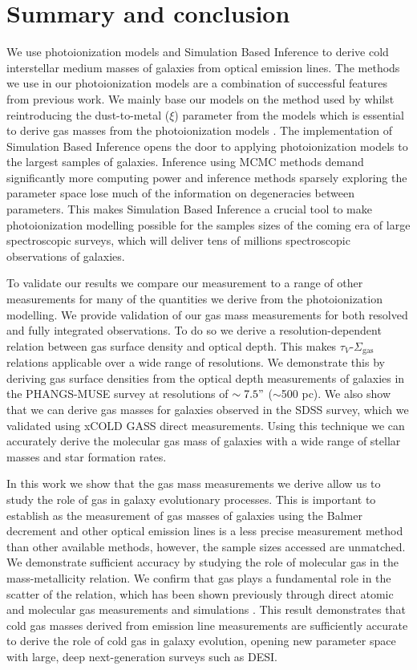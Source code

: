 \documentclass[fleqn,usenatbib]{mnras}
\begin{document}
\section{Summary and conclusion}
\label{sec:conclusion}
We use photoionization models and Simulation Based Inference to derive cold interstellar medium masses of galaxies from optical emission lines. The methods we use in our photoionization models are a combination of successful features from previous work. We mainly base our models on the method used by \cite{byler2017} whilst reintroducing the dust-to-metal ($\xi$) parameter from the \cite{charlot2001} models which is essential to derive gas masses from the photoionization models \citep{brinchmann2013}. The implementation of Simulation Based Inference opens the door to applying photoionization models to the largest samples of galaxies. Inference using MCMC methods demand significantly more computing power and inference methods sparsely exploring the parameter space lose much of the information on degeneracies between parameters. This makes Simulation Based Inference a crucial tool to make photoionization modelling possible for the samples sizes of the coming era of large spectroscopic surveys, which will deliver tens of millions spectroscopic observations of galaxies.

To validate our results we compare our measurement to a range of other measurements for many of the quantities we derive from the photoionization modelling. We provide validation of our gas mass measurements for both resolved and fully integrated observations. To do so we derive a resolution-dependent relation between gas surface density and optical depth. This makes $\tau_{V}$-$\Sigma_{\textrm{gas}}$ relations applicable over a wide range of resolutions. We demonstrate this by deriving gas surface densities from the optical depth measurements of galaxies in the PHANGS-MUSE survey at resolutions of $\sim7.5"$ ($\sim$500 pc). We also show that we can derive gas masses for galaxies observed in the SDSS survey, which we validated using xCOLD GASS direct measurements. Using this technique we can accurately derive the molecular gas mass of galaxies with a wide range of stellar masses and star formation rates. 

In this work we show that the gas mass measurements we derive allow us to study the role of gas in galaxy evolutionary processes. This is important to establish as the measurement of gas masses of galaxies using the Balmer decrement and other optical emission lines is a less precise measurement method than other available methods, however, the sample sizes accessed are unmatched. We demonstrate sufficient accuracy by studying the role of molecular gas in the mass-metallicity relation. We confirm that gas plays a fundamental role in the scatter of the relation, which has been shown previously through direct atomic and molecular gas measurements and simulations \citep[e.g.][]{bothwell2013, bothwell2016, loon2021}. This result demonstrates that cold gas masses derived from emission line measurements are sufficiently accurate to derive the role of cold gas in galaxy evolution, opening new parameter space with large, deep next-generation surveys such as DESI. 
\end{document}
